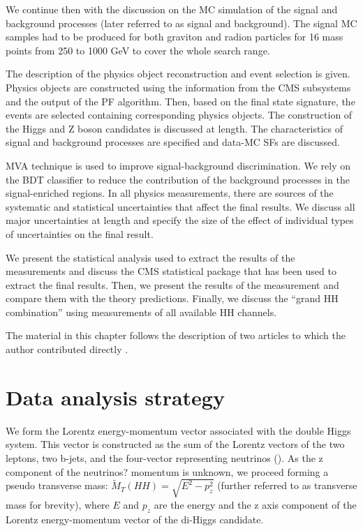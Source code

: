 We continue then with the discussion on the MC simulation of the signal and background processes (later referred to as signal and background). The signal MC samples had to be produced for both graviton and radion particles for 16 mass points from 250 to 1000 GeV to cover the whole search range.  

The description of the physics object reconstruction and event selection is given. Physics objects are constructed using the information from the CMS subsystems and the output of the PF algorithm. Then, based on the final state signature, the events are selected containing corresponding physics objects. The construction of the Higgs and Z boson candidates is discussed at length. The characteristics of signal and background processes are specified and data-MC SFs are discussed.

MVA technique is used to improve signal-background discrimination. We rely on the BDT classifier to reduce the contribution of the background processes in the signal-enriched regions. In all physics measurements, there are sources of the systematic and statistical uncertainties that affect the final results. We discuss all major uncertainties at length and specify the size of the effect of individual types of uncertainties on the final result. 

We present the statistical analysis used to extract the results of the measurements and discuss the CMS statistical package that has been used to extract the final results. Then, we present the results of the measurement and compare them with the theory predictions. Finally, we discuss the ``grand HH combination'' using measurements of all available HH channels.

The material in this chapter follows the description of two articles to which the author contributed directly \cite{bbZZAN, CMS-PAS-HIG-17-032}.


\section{Data analysis strategy}
\label{sec:strategy}
We form the Lorentz energy-momentum vector associated with the double Higgs system. This vector is constructed as the sum  of  the  Lorentz  vectors  of  the  two  leptons,  two  b-jets,  and  the  four-vector  representing neutrinos (\PTslash).  As the z component of the neutrinos? momentum is unknown, we proceed forming a pseudo transverse mass:
$\tilde{M}_T(HH) = \sqrt{E^2 - p_{z}^2}$ (further referred to as transverse mass for brevity), where $E$ and $p_z$ are the energy and the z axis component of the Lorentz energy-momentum vector of the di-Higgs candidate.

